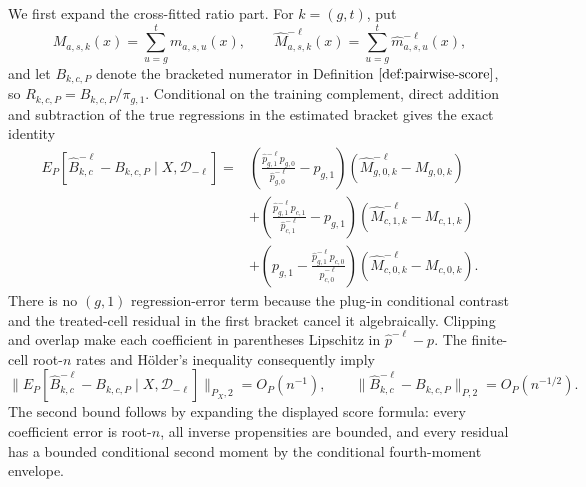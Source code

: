 We first expand the cross-fitted ratio part.  For \(k=(g,t)\), put
\[
M_{a,s,k}(x)=\sum_{u=g}^t m_{a,s,u}(x),
\qquad
\widehat M_{a,s,k}^{-\ell}(x)=\sum_{u=g}^t\widehat m_{a,s,u}^{-\ell}(x),
\]
and let \(B_{k,c,P}\) denote the bracketed numerator in Definition \(\ref{def:pairwise-score}\), so \(R_{k,c,P}=B_{k,c,P}/\pi_{g,1}\).  Conditional on the training complement, direct addition and subtraction of the true regressions in the estimated bracket gives the exact identity
\[
\begin{aligned}
E_P[\widehat B_{k,c}^{-\ell}-B_{k,c,P}\mid X,\mathcal D_{-\ell}]
={}&\left(\frac{\widehat p_{g,1}^{-\ell}p_{g,0}}{\widehat p_{g,0}^{-\ell}}-p_{g,1}\right)
(\widehat M_{g,0,k}^{-\ell}-M_{g,0,k})\\
&+\left(\frac{\widehat p_{g,1}^{-\ell}p_{c,1}}{\widehat p_{c,1}^{-\ell}}-p_{g,1}\right)
(\widehat M_{c,1,k}^{-\ell}-M_{c,1,k})\\
&+\left(p_{g,1}-\frac{\widehat p_{g,1}^{-\ell}p_{c,0}}{\widehat p_{c,0}^{-\ell}}\right)
(\widehat M_{c,0,k}^{-\ell}-M_{c,0,k}).
\end{aligned}
\tag{41d}
\]
There is no \((g,1)\) regression-error term because the plug-in conditional contrast and the treated-cell residual in the first bracket cancel it algebraically.  Clipping and overlap make each coefficient in parentheses Lipschitz in \(\widehat p^{-\ell}-p\).  The finite-cell root-\(n\) rates and H\"older's inequality consequently imply
\[
\|E_P[\widehat B_{k,c}^{-\ell}-B_{k,c,P}\mid X,\mathcal D_{-\ell}]\|_{P_X,2}
=O_P(n^{-1}),
\qquad
\|\widehat B_{k,c}^{-\ell}-B_{k,c,P}\|_{P,2}=O_P(n^{-1/2}).
\tag{41e}
\]
The second bound follows by expanding the displayed score formula: every coefficient error is root-\(n\), all inverse propensities are bounded, and every residual has a bounded conditional second moment by the conditional fourth-moment envelope.

